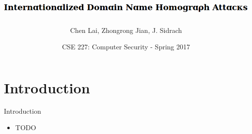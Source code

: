 \documentclass[usepdftitle=false]{beamer}
\title{\includegraphics[width=0.8\linewidth]{title}}
\author{Chen Lai, Zhongrong Jian, J. Sidrach}
\institute{University of California San Diego}
\date{CSE 227: Computer Security - Spring 2017}
\begin{document}
\begin{frame}
  \titlepage
\end{frame}


\section{Introduction}

\begin{frame}{Introduction}
\begin{itemize}
  \item TODO
\end{itemize}
\end{frame}
\end{document}
